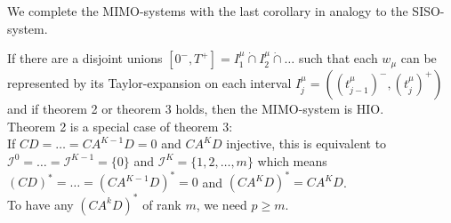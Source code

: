 We complete the MIMO-systems with the last corollary in analogy to the SISO-system.
\begin{corollary}{}{}
	If there are a disjoint unions $[0^-,T^+]=I^\mu_1\dot{\cap} I_2^\mu\dot{\cap}\ldots$ 
	such that each $w_\mu$ can be represented by its Taylor-expansion on 
	each interval $I_j^\mu=((t_{j-1}^\mu)^- ,(t_j^\mu)^+)$ and if theorem 2 or theorem 3 
	holds, then the MIMO-system is HIO. \\
	
	Theorem 2 is a special case of theorem 3: \\
	If $CD=\ldots=CA^{K-1}D=0$ and $CA^KD$ injective, this is equivalent to $\mathcal{I}^0=
	\ldots =
	\mathcal{I}^{K-1} =\{0\}$ and $\mathcal{I}^K=\{1,2,\ldots,m\}$ which means 
	$(CD)^*=\ldots=(CA^{K-1}D)^*=0$ and $(CA^KD)^*=CA^KD$. \\	
	
	To have any $(CA^kD)^*$ of rank $m$, we need $p\geq m$.
\end{corollary}

